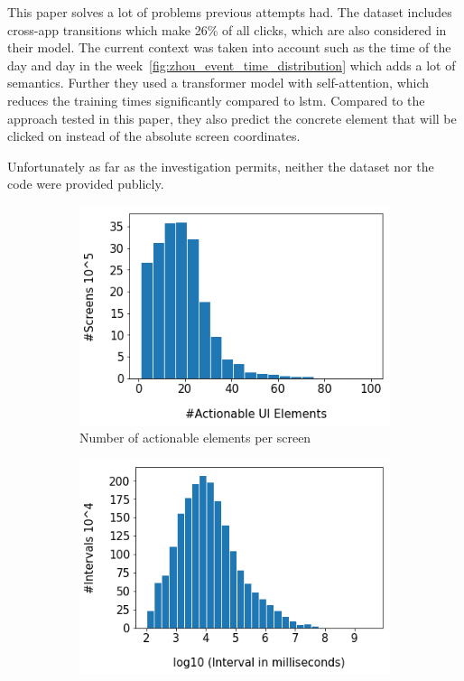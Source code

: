 This paper solves a lot of problems previous attempts had.
The dataset includes cross-app transitions which make 26\% of all clicks, which are also considered in their model.
The current context was taken into account such as the time of the day and day in the week~\ref{fig:zhou_event_time_distribution} which adds a lot of semantics.
Further they used a transformer model with self-attention, which reduces the training times significantly compared to \gls{lstm}.
Compared to the approach tested in this paper, they also predict the concrete element that will be clicked on instead of the absolute screen coordinates.

Unfortunately as far as the investigation permits, neither the dataset nor the code were provided publicly.

\begin{figure}[htbp!]
  \centering
  \begin{subfigure}[b]{0.3\textwidth}
    \centering
    \includegraphics[width=\textwidth]{graphics/zhou_actionable_elements}
    \caption{Number of actionable elements per screen}
    \label{fig:zhou_actionable_elements}
  \end{subfigure}
  \hfill
  \begin{subfigure}[b]{0.3\textwidth}
    \centering
    \includegraphics[width=\textwidth]{graphics/zhou_event_time_intervals}

\end{subfigure}
\end{figure}
